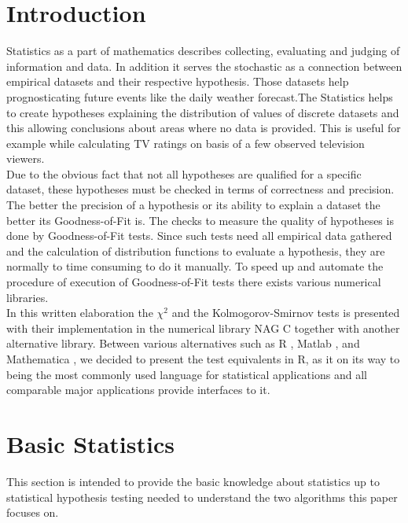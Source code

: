 \documentclass{article}
\theoremstyle{definition}
\begin{document}
\section{Introduction}
Statistics as a part of mathematics describes collecting, evaluating and judging of information and data. In addition it serves the stochastic as a connection between empirical datasets and their respective hypothesis. Those datasets help prognosticating future events like the daily weather forecast.The Statistics helps to create hypotheses explaining the distribution of values of discrete datasets and this allowing conclusions about areas where no data is provided. This is useful for example while calculating TV ratings on basis of a few observed television viewers.\\
Due to the obvious fact that not all hypotheses are qualified for a specific dataset, these hypotheses must be checked in terms of correctness and precision.
The better the precision of a hypothesis or its ability to explain a dataset the better its Goodness-of-Fit is.
The checks to measure the quality of hypotheses is done by Goodness-of-Fit tests. Since such tests need all empirical data gathered and the calculation of distribution functions to evaluate a hypothesis, they are normally to time consuming to do it manually. To speed up and automate the procedure of execution of Goodness-of-Fit tests there exists various numerical libraries.\\ 
In this written elaboration the $\chi^2$ and the Kolmogorov-Smirnov tests is presented with their implementation in the numerical library NAG C together with another alternative library. Between various alternatives such as R \cite{hellbrueck2009angewandte}, Matlab \cite{benker2001statistik}, and Mathematica \cite{jaeger1997statistik}, we decided to present the test equivalents in R, as it on its way to being the most commonly used language for statistical applications and all comparable major applications provide interfaces to it.
\section{Basic Statistics}
This section is intended to provide the basic knowledge about statistics up to statistical hypothesis testing needed to understand the two algorithms this paper focuses on.
\end{document}
